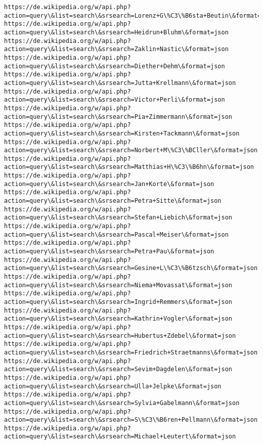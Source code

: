 \documentclass[11pt]{article}
\begin{document}
\begin{Verbatim}[commandchars=\\\{\}]
https://de.wikipedia.org/w/api.php?action=query\&list=search\&srsearch=Lorenz+G\%C3\%B6sta+Beutin\&format=json
https://de.wikipedia.org/w/api.php?action=query\&list=search\&srsearch=Heidrun+Bluhm\&format=json
https://de.wikipedia.org/w/api.php?action=query\&list=search\&srsearch=Zaklin+Nastic\&format=json
https://de.wikipedia.org/w/api.php?action=query\&list=search\&srsearch=Diether+Dehm\&format=json
https://de.wikipedia.org/w/api.php?action=query\&list=search\&srsearch=Jutta+Krellmann\&format=json
https://de.wikipedia.org/w/api.php?action=query\&list=search\&srsearch=Victor+Perli\&format=json
https://de.wikipedia.org/w/api.php?action=query\&list=search\&srsearch=Pia+Zimmermann\&format=json
https://de.wikipedia.org/w/api.php?action=query\&list=search\&srsearch=Kirsten+Tackmann\&format=json
https://de.wikipedia.org/w/api.php?action=query\&list=search\&srsearch=Norbert+M\%C3\%BCller\&format=json
https://de.wikipedia.org/w/api.php?action=query\&list=search\&srsearch=Matthias+H\%C3\%B6hn\&format=json
https://de.wikipedia.org/w/api.php?action=query\&list=search\&srsearch=Jan+Korte\&format=json
https://de.wikipedia.org/w/api.php?action=query\&list=search\&srsearch=Petra+Sitte\&format=json
https://de.wikipedia.org/w/api.php?action=query\&list=search\&srsearch=Stefan+Liebich\&format=json
https://de.wikipedia.org/w/api.php?action=query\&list=search\&srsearch=Pascal+Meiser\&format=json
https://de.wikipedia.org/w/api.php?action=query\&list=search\&srsearch=Petra+Pau\&format=json
https://de.wikipedia.org/w/api.php?action=query\&list=search\&srsearch=Gesine+L\%C3\%B6tzsch\&format=json
https://de.wikipedia.org/w/api.php?action=query\&list=search\&srsearch=Niema+Movassat\&format=json
https://de.wikipedia.org/w/api.php?action=query\&list=search\&srsearch=Ingrid+Remmers\&format=json
https://de.wikipedia.org/w/api.php?action=query\&list=search\&srsearch=Kathrin+Vogler\&format=json
https://de.wikipedia.org/w/api.php?action=query\&list=search\&srsearch=Hubertus+Zdebel\&format=json
https://de.wikipedia.org/w/api.php?action=query\&list=search\&srsearch=Friedrich+Straetmanns\&format=json
https://de.wikipedia.org/w/api.php?action=query\&list=search\&srsearch=Sevim+Dagdelen\&format=json
https://de.wikipedia.org/w/api.php?action=query\&list=search\&srsearch=Ulla+Jelpke\&format=json
https://de.wikipedia.org/w/api.php?action=query\&list=search\&srsearch=Sylvia+Gabelmann\&format=json
https://de.wikipedia.org/w/api.php?action=query\&list=search\&srsearch=S\%C3\%B6ren+Pellmann\&format=json
https://de.wikipedia.org/w/api.php?action=query\&list=search\&srsearch=Michael+Leutert\&format=json

\end{Verbatim}
\end{document}
